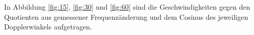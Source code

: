 \noindent In Abbildung \ref{fig:15}, \ref{fig:30} und \ref{fig:60} sind die Geschwindigkeiten gegen den Quotienten aus gemessener Frequenzänderung und dem Cosinus des jeweiligen
Dopplerwinkels aufgetragen.


